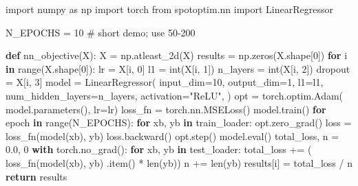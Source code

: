 \documentclass[
  twocolumn]{article}
\newenvironment{Shaded}{\begin{snugshade}}{\end{snugshade}}
\newcommand{\BuiltInTok}[1]{\textcolor[rgb]{0.00,0.23,0.31}{#1}}
\newcommand{\CommentTok}[1]{\textcolor[rgb]{0.37,0.37,0.37}{#1}}
\newcommand{\ControlFlowTok}[1]{\textcolor[rgb]{0.00,0.23,0.31}{\textbf{#1}}}
\newcommand{\DecValTok}[1]{\textcolor[rgb]{0.68,0.00,0.00}{#1}}
\newcommand{\FloatTok}[1]{\textcolor[rgb]{0.68,0.00,0.00}{#1}}
\newcommand{\ImportTok}[1]{\textcolor[rgb]{0.00,0.46,0.62}{#1}}
\newcommand{\KeywordTok}[1]{\textcolor[rgb]{0.00,0.23,0.31}{\textbf{#1}}}
\newcommand{\NormalTok}[1]{\textcolor[rgb]{0.00,0.23,0.31}{#1}}
\newcommand{\OperatorTok}[1]{\textcolor[rgb]{0.37,0.37,0.37}{#1}}
\newcommand{\StringTok}[1]{\textcolor[rgb]{0.13,0.47,0.30}{#1}}
\begin{document}
\begin{Shaded}
\begin{Highlighting}[]
\ImportTok{import}\NormalTok{ numpy }\ImportTok{as}\NormalTok{ np}
\ImportTok{import}\NormalTok{ torch}
\ImportTok{from}\NormalTok{ spotoptim.nn }\ImportTok{import}\NormalTok{ LinearRegressor}

\NormalTok{N\_EPOCHS }\OperatorTok{=} \DecValTok{10}  \CommentTok{\# short demo; use 50{-}200}

\KeywordTok{def}\NormalTok{ nn\_objective(X):}
\NormalTok{    X }\OperatorTok{=}\NormalTok{ np.atleast\_2d(X)}
\NormalTok{    results }\OperatorTok{=}\NormalTok{ np.zeros(X.shape[}\DecValTok{0}\NormalTok{])}
    \ControlFlowTok{for}\NormalTok{ i }\KeywordTok{in} \BuiltInTok{range}\NormalTok{(X.shape[}\DecValTok{0}\NormalTok{]):}
\NormalTok{        lr }\OperatorTok{=}\NormalTok{ X[i, }\DecValTok{0}\NormalTok{]}
\NormalTok{        l1 }\OperatorTok{=} \BuiltInTok{int}\NormalTok{(X[i, }\DecValTok{1}\NormalTok{])}
\NormalTok{        n\_layers }\OperatorTok{=} \BuiltInTok{int}\NormalTok{(X[i, }\DecValTok{2}\NormalTok{])}
\NormalTok{        dropout }\OperatorTok{=}\NormalTok{ X[i, }\DecValTok{3}\NormalTok{]}
\NormalTok{        model }\OperatorTok{=}\NormalTok{ LinearRegressor(}
\NormalTok{            input\_dim}\OperatorTok{=}\DecValTok{10}\NormalTok{, output\_dim}\OperatorTok{=}\DecValTok{1}\NormalTok{,}
\NormalTok{            l1}\OperatorTok{=}\NormalTok{l1,}
\NormalTok{            num\_hidden\_layers}\OperatorTok{=}\NormalTok{n\_layers,}
\NormalTok{            activation}\OperatorTok{=}\StringTok{"ReLU"}\NormalTok{,}
\NormalTok{        )}
\NormalTok{        opt }\OperatorTok{=}\NormalTok{ torch.optim.Adam(}
\NormalTok{            model.parameters(), lr}\OperatorTok{=}\NormalTok{lr)}
\NormalTok{        loss\_fn }\OperatorTok{=}\NormalTok{ torch.nn.MSELoss()}
\NormalTok{        model.train()}
        \ControlFlowTok{for}\NormalTok{ epoch }\KeywordTok{in} \BuiltInTok{range}\NormalTok{(N\_EPOCHS):}
            \ControlFlowTok{for}\NormalTok{ xb, yb }\KeywordTok{in}\NormalTok{ train\_loader:}
\NormalTok{                opt.zero\_grad()}
\NormalTok{                loss }\OperatorTok{=}\NormalTok{ loss\_fn(model(xb), yb)}
\NormalTok{                loss.backward()}
\NormalTok{                opt.step()}
\NormalTok{        model.}\BuiltInTok{eval}\NormalTok{()}
\NormalTok{        total\_loss, n }\OperatorTok{=} \FloatTok{0.0}\NormalTok{, }\DecValTok{0}
        \ControlFlowTok{with}\NormalTok{ torch.no\_grad():}
            \ControlFlowTok{for}\NormalTok{ xb, yb }\KeywordTok{in}\NormalTok{ test\_loader:}
\NormalTok{                total\_loss }\OperatorTok{+=}\NormalTok{ (}
\NormalTok{                    loss\_fn(model(xb), yb)}
\NormalTok{                    .item() }\OperatorTok{*} \BuiltInTok{len}\NormalTok{(yb))}
\NormalTok{                n }\OperatorTok{+=} \BuiltInTok{len}\NormalTok{(yb)}
\NormalTok{        results[i] }\OperatorTok{=}\NormalTok{ total\_loss }\OperatorTok{/}\NormalTok{ n}
    \ControlFlowTok{return}\NormalTok{ results}
\end{Highlighting}
\end{Shaded}
\end{document}
